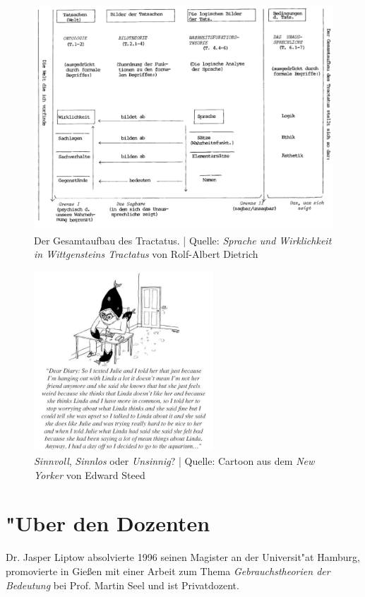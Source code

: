 \documentclass[]{scrartcl}
\begin{document}
\begin{figure}[h]
	\centering
	\includegraphics[width=1\textwidth]{images/tractatus/tractatus-structur.png}
	\caption{Der Gesamtaufbau des Tractatus. | Quelle: \emph{Sprache und Wirklichkeit in Wittgensteins Tractatus} von Rolf-Albert Dietrich}
	\label{fig:struct}
\end{figure}
\begin{figure}[h]
	\centering
	\includegraphics[width=0.6\textwidth]{images/tractatus/newyorker}
	\caption{\emph{Sinnvoll}, \emph{Sinnlos} oder \emph{Unsinnig}? | Quelle: Cartoon aus dem \emph{New Yorker} von Edward Steed}
	\label{fig:newyorker}
\end{figure}


\newpage
\section{"Uber den Dozenten}
Dr. Jasper Liptow absolvierte 1996 seinen Magister an der Universit"at Hamburg, promovierte in Gie\ss en mit einer Arbeit zum Thema \emph{Gebrauchstheorien der Bedeutung} bei Prof. Martin Seel und ist Privatdozent.
\end{document}
